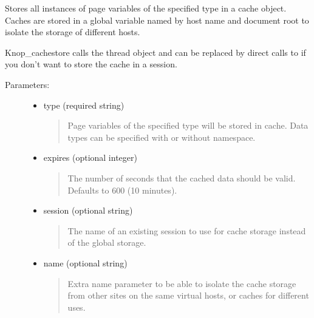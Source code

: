 \documentclass[letterpaper,10pt,english]{sphinxmanual}
\begin{document}
\begin{fulllineitems}
Stores all instances of page variables of the specified type in a cache object.
Caches are stored in a global variable named by host name and document root to
isolate the storage of different hosts.

Knop\_cachestore calls the thread object {\hyperref[knop_cache:knop_cache]{}} and can be replaced
by direct calls to {\hyperref[knop_cache:knop_cache]{}} if you don't want to store the cache in a
session.
\begin{description}
\item[{Parameters:}] \leavevmode\begin{itemize}
\item {} 
type (required string)
\begin{quote}

Page variables of the specified type will be stored in cache. Data types
can be specified with or without namespace.
\end{quote}

\item {} 
expires (optional integer)
\begin{quote}

The number of seconds that the cached data should be valid. Defaults to
600 (10 minutes).
\end{quote}

\item {} 
session (optional string)
\begin{quote}

The name of an existing session to use for cache storage instead of the
global storage.
\end{quote}

\item {} 
name (optional string)
\begin{quote}

Extra name parameter to be able to isolate the cache storage from other
sites on the same virtual hosts, or caches for different uses.
\end{quote}

\end{itemize}

\end{description}

\end{fulllineitems}
\end{document}
